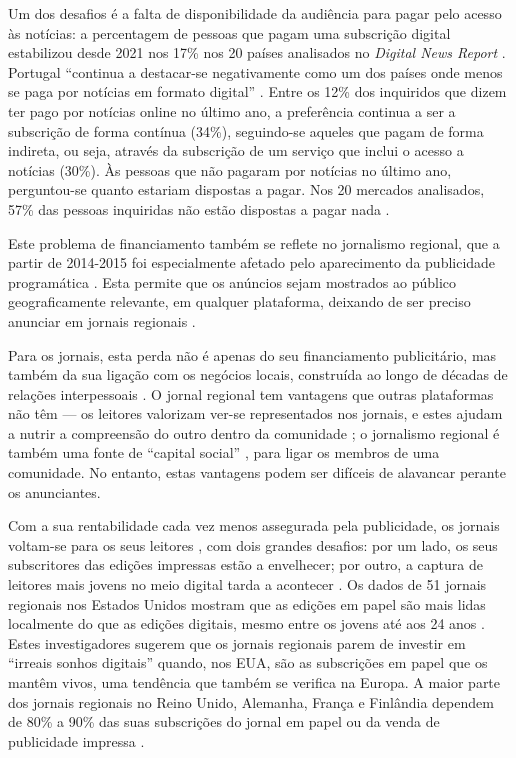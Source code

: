 \documentclass[portuguese]{textolivre}
\begin{document}
Um dos desafios é a falta de disponibilidade da audiência para pagar
pelo acesso às notícias: a percentagem de pessoas que pagam uma
subscrição digital estabilizou desde 2021 nos 17\% nos 20 países
analisados no \emph{Digital News Report} \cite{Newman2024}.
Portugal ``continua a destacar-se negativamente como um dos países onde
menos se paga por notícias em formato digital'' \cite[p.~104]{Cardoso2022}. 
Entre os 12\% dos inquiridos que dizem
ter pago por notícias online no último ano, a preferência continua a ser
a subscrição de forma contínua (34\%), seguindo-se aqueles que pagam de
forma indireta, ou seja, através da subscrição de um serviço que inclui
o acesso a notícias (30\%). Às pessoas que não pagaram por notícias no
último ano, perguntou-se quanto estariam dispostas a pagar. Nos 20
mercados analisados, 57\% das pessoas inquiridas não estão dispostas a
pagar nada \cite[p.~51]{Newman2024}.

Este problema de financiamento também se reflete no jornalismo regional,
que a partir de 2014-2015 foi especialmente afetado pelo aparecimento da
publicidade programática \cite{Sjovaag2021}. Esta permite que os
anúncios sejam mostrados ao público geograficamente relevante, em
qualquer plataforma, deixando de ser preciso anunciar em jornais
regionais \cite{Ohlsson2017}.

Para os jornais, esta perda não é apenas do seu financiamento
publicitário, mas também da sua ligação com os negócios locais,
construída ao longo de décadas de relações interpessoais
\cite{Sjovaag2021}. O jornal regional tem vantagens que outras
plataformas não têm --- os leitores valorizam ver-se representados nos
jornais, e estes ajudam a nutrir a compreensão do outro dentro da
comunidade \cite{CosteraMeijer2016}; o jornalismo regional é também uma
fonte de ``capital social'' \cite{Hess2015}, para ligar os membros de
uma comunidade. No entanto, estas vantagens podem ser difíceis de
alavancar perante os anunciantes.

Com a sua rentabilidade cada vez menos assegurada pela publicidade, os
jornais voltam-se para os seus leitores \cite{Jenkins2017}, com dois
grandes desafios: por um lado, os seus subscritores das edições
impressas estão a envelhecer; por outro, a captura de leitores mais
jovens no meio digital tarda a acontecer \cite{Sjovaag2021}. Os dados
de 51 jornais regionais nos Estados Unidos mostram que as edições em
papel são mais lidas localmente do que as edições digitais, mesmo entre
os jovens até aos 24 anos \cite{Chyi2019}. Estes investigadores sugerem
que os jornais regionais parem de investir em ``irreais sonhos
digitais'' quando, nos EUA, são as subscrições em papel que os mantêm
vivos, uma tendência que também se verifica na Europa. A maior parte dos
jornais regionais no Reino Unido, Alemanha, França e Finlândia dependem
de 80\% a 90\% das suas subscrições do jornal em papel ou da venda de
publicidade impressa \cite{Jenkins2017}.
\end{document}
